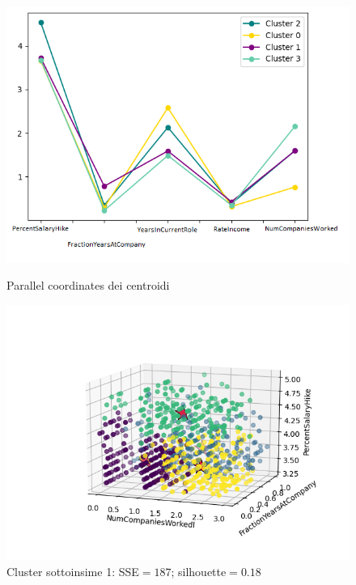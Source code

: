 \documentclass[a4paper,9pt]{article}
\begin{document}
\begin{figure}[H]
\begin{minipage}[b]{0.47\textwidth}
\centering
\includegraphics[width=\textwidth]{parallelsub1.png}
\caption{Parallel coordinates dei centroidi}
\label{etichetta1}
\end{minipage}
\hfill
\begin{minipage}[b]{0.55\textwidth}
\includegraphics[scale=0.6]{numcompan_Fraction_percentCENTROIDI.png}
\caption{Cluster sottoinsime 1: SSE$=187$; silhouette$=0.18$}
\label{etichetta2}
\end{minipage}
\end{figure}
\end{document}

